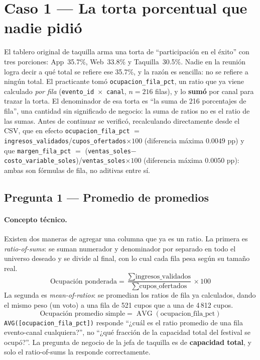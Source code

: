 \section{Caso 1 --- La torta porcentual que nadie pidió}\label{sec:caso1}

El tablero original de taquilla arma una torta de \enquote{participación en el éxito} con tres porciones: App~35.7\%, Web~33.8\% y Taquilla~30.5\%. Nadie en la reunión logra decir a qué total se refiere ese 35.7\%, y la razón es sencilla: no se refiere a ningún total. El practicante tomó \lstinline|ocupacion_fila_pct|, un ratio que ya viene calculado \emph{por fila} (\lstinline|evento_id|~$\times$~\lstinline|canal|, $n=216$ filas), y lo \textbf{sumó} por canal para trazar la torta. El denominador de esa torta es \enquote{la suma de 216 porcentajes de fila}, una cantidad sin significado de negocio: la suma de ratios no es el ratio de las sumas. Antes de continuar se verificó, recalculando directamente desde el CSV, que en efecto \lstinline|ocupacion_fila_pct| $=$ \lstinline|ingresos_validados|/\lstinline|cupos_ofertados|$\times 100$ (diferencia máxima $0.0049$ pp) y que \lstinline|margen_fila_pct| $=$ (\lstinline|ventas_soles|$-$\lstinline|costo_variable_soles|)/\lstinline|ventas_soles|$\times 100$ (diferencia máxima $0.0050$ pp): ambas son fórmulas de fila, no aditivas entre sí.

\subsection{Pregunta 1 --- Promedio de promedios}\label{ssec:c1-q1}

\paragraph{Concepto técnico.} Existen dos maneras de agregar una columna que ya es un ratio. La primera es \emph{ratio-of-sums}: se suman numerador y denominador por separado en todo el universo deseado y se divide al final, con lo cual cada fila pesa según su tamaño real.
\[
\text{Ocupación ponderada} = \frac{\sum \text{ingresos\_validados}}{\sum \text{cupos\_ofertados}} \times 100
\]
La segunda es \emph{mean-of-ratios}: se promedian los ratios de fila ya calculados, dando el mismo peso (un voto) a una fila de 521 cupos que a una de 4\,812 cupos.
\[
\text{Ocupación promedio simple} = \operatorname{AVG}(\text{ocupacion\_fila\_pct})
\]
\lstinline|AVG([ocupacion_fila_pct])| responde \enquote{¿cuál es el ratio promedio de una fila evento-canal cualquiera?}, no \enquote{¿qué fracción de la capacidad total del festival se ocupó?}. La pregunta de negocio de la jefa de taquilla es de \textbf{capacidad total}, y solo el ratio-of-sums la responde correctamente.


